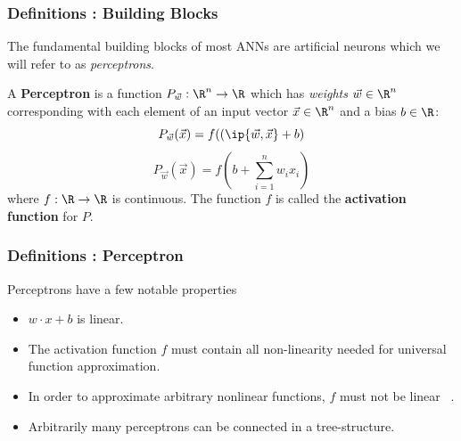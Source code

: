

\begin{frame}
  \frametitle{Definitions : Building Blocks}

The fundamental building blocks of most ANNs are artificial neurons which we will refer to as \emph{perceptrons}.

\begin{definition}{A \textbf{Perceptron} is  }
\label{perceptron}
a function $P_{\vec w}: \R^n \to \R$ which has \emph{weights} $\vec
w \in \R^n$ corresponding with each element of an input vector $\vec
x\in \R^n$ and a bias $b \in \R$:
\[P_{\vec w}(\vec x) = f(\left(\ip{\vec w,\vec x} + b\right)\]
\[P_{\vec w}(\vec x) = f\left(b + \sum_{i = 1}^n w_i x_i\right)\]
where $f: \R \to \R$ is continuous. The function $f$ is called the \textbf{activation function} for $P$. 
\end{definition}

\end{frame}

\begin{frame}
  \frametitle{Definitions : Perceptron}
  Perceptrons have a few notable properties
  \begin{itemize}
  \item $w \cdot x + b$ is linear.
    \item The activation function $f$ must contain all non-linearity
      needed for universal function approximation.
      \item In order to approximate arbitrary nonlinear functions, $f$ must
        not be linear ~\citep{attali1997approximations}.
        \item Arbitrarily many perceptrons can be connected in a
          tree-structure.
\end{itemize}
\end{frame}
      

